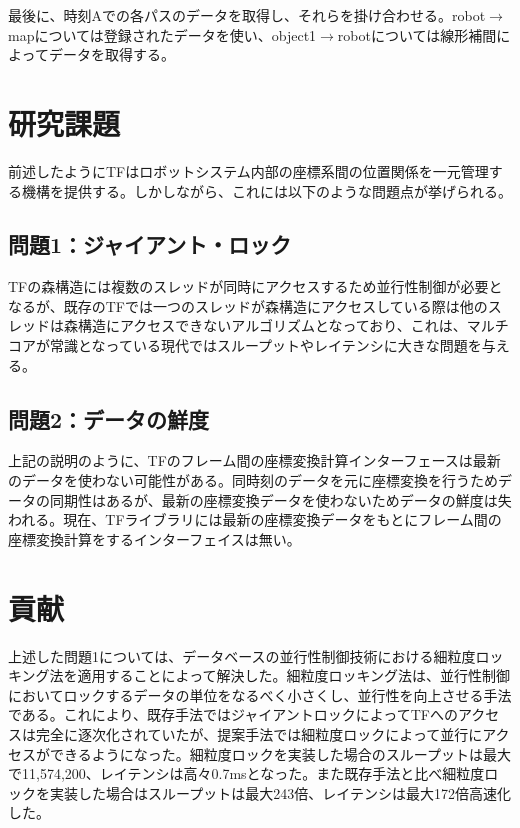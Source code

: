 \documentclass[a4paper]{jreport}	%
\begin{document}
最後に、時刻Aでの各パスのデータを取得し、それらを掛け合わせる。robot$\rightarrow$mapについては登録されたデータを使い、object1$\rightarrow$robotについては線形補間によってデータを取得する。

\section{研究課題}
前述したようにTFはロボットシステム内部の座標系間の位置関係を一元管理する機構を提供する。しかしながら、これには以下のような問題点が挙げられる。

\subsection*{問題1：ジャイアント・ロック}
TFの森構造には複数のスレッドが同時にアクセスするため並行性制御が必要となるが、既存のTFでは一つのスレッドが森構造にアクセスしている際は他のスレッドは森構造にアクセスできないアルゴリズムとなっており、これは、マルチコアが常識となっている現代ではスループットやレイテンシに大きな問題を与える。

\subsection*{問題2：データの鮮度}

上記の説明のように、TFのフレーム間の座標変換計算インターフェースは最新のデータを使わない可能性がある。同時刻のデータを元に座標変換を行うためデータの同期性はあるが、最新の座標変換データを使わないためデータの鮮度は失われる。現在、TFライブラリには最新の座標変換データをもとにフレーム間の座標変換計算をするインターフェイスは無い。

\section{貢献}
上述した問題1については、データベースの並行性制御技術における細粒度ロッキング法を適用することによって解決した。細粒度ロッキング法は、並行性制御においてロックするデータの単位をなるべく小さくし、並行性を向上させる手法である。これにより、既存手法ではジャイアントロックによってTFへのアクセスは完全に逐次化されていたが、提案手法では細粒度ロックによって並行にアクセスができるようになった。細粒度ロックを実装した場合のスループットは最大で11,574,200、レイテンシは高々0.7msとなった。また既存手法と比べ細粒度ロックを実装した場合はスループットは最大243倍、レイテンシは最大172倍高速化した。
\end{document}
